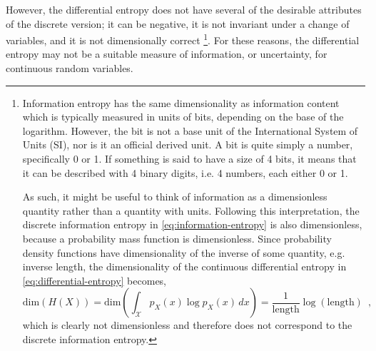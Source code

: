 However, the differential entropy does not have several of the desirable attributes of the discrete version; it can be negative, it is not invariant under a change of variables, and it is not dimensionally correct%
\footnote{\label{fn:dimensional-analysis-of-differential-entropy}
    Information entropy has the same dimensionality as information content which is typically measured in units of bits, depending on the base of the logarithm. 
    However, the bit is not a base unit of the International System of Units (SI), nor is it an official derived unit.
    A bit is quite simply a number, specifically 0 or 1. If something is said to have a size of 4 bits, it means that it can be described with 4 binary digits, i.e. 4 numbers, each either 0 or 1.

    As such, it might be useful to think of information as a dimensionless quantity rather than a quantity with units.
    Following this interpretation, the discrete information entropy in \cref{eq:information-entropy} is also dimensionless, because a probability mass function is dimensionless. 
    Since probability density functions have dimensionality of the inverse of some quantity, e.g. inverse length, the dimensionality of the continuous differential entropy in \cref{eq:differential-entropy} becomes,
    \begin{equation*}
        \text{dim} \left( H(X) \right) = \text{dim} \left( \int_{\mathcal{X}} p_X(x) \log p_X(x) \, dx \right) = \frac{1}{\text{length}} \log\left(\text{length}\right) \enspace ,
    \end{equation*}
    which is clearly not dimensionless and therefore does not correspond to the discrete information entropy.
}. 
For these reasons, the differential entropy may not be a suitable measure of information, or uncertainty, for continuous random variables. 

